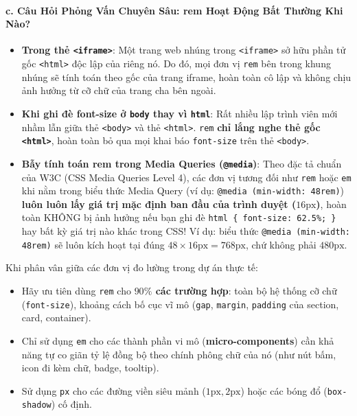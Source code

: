 \documentclass[11pt,oneside]{book}
\newcommand{\codeinline}[1]{\textcolor{accentOrange}{\texttt{#1}}}
\newcommand{\term}[1]{\textbf{\textcolor{primaryBlue}{#1}}}
\begin{document}
\paragraph{c. Câu Hỏi Phỏng Vấn Chuyên Sâu: rem Hoạt Động Bất Thường Khi Nào?}
\begin{itemize}[leftmargin=1.5em, itemsep=2pt, parsep=0pt]
    \item \textbf{Trong thẻ \codeinline{<iframe>}}: Một trang web nhúng trong \codeinline{<iframe>} sở hữu phần tử gốc \codeinline{<html>} độc lập của riêng nó. Do đó, mọi đơn vị \codeinline{rem} bên trong khung nhúng sẽ tính toán theo gốc của trang iframe, hoàn toàn cô lập và không chịu ảnh hưởng từ cỡ chữ của trang cha bên ngoài.
    \item \textbf{Khi ghi đè font-size ở \codeinline{body} thay vì \codeinline{html}}: Rất nhiều lập trình viên mới nhầm lẫn giữa thẻ \codeinline{<body>} và thẻ \codeinline{<html>}. \codeinline{rem} \textbf{chỉ lắng nghe thẻ gốc \codeinline{<html>}}, hoàn toàn bỏ qua mọi khai báo \codeinline{font-size} trên thẻ \codeinline{<body>}.
    \item \textbf{Bẫy tính toán rem trong Media Queries (\codeinline{@media})}: Theo đặc tả chuẩn của W3C (CSS Media Queries Level 4), các đơn vị tương đối như \codeinline{rem} hoặc \codeinline{em} khi nằm trong biểu thức Media Query (ví dụ: \codeinline{@media (min-width: 48rem)}) \textbf{luôn luôn lấy giá trị mặc định ban đầu của trình duyệt ($16\text{px}$)}, hoàn toàn KHÔNG bị ảnh hưởng nếu bạn ghi đè \codeinline{html \{ font-size: 62.5\%; \}} hay bất kỳ giá trị nào khác trong CSS! Ví dụ: biểu thức \codeinline{@media (min-width: 48rem)} sẽ luôn kích hoạt tại đúng $48 \times 16\text{px} = 768\text{px}$, chứ không phải $480\text{px}$.
\end{itemize}

\begin{tipBox}
Khi phân vân giữa các đơn vị đo lường trong dự án thực tế:
\begin{itemize}[leftmargin=1.2em, itemsep=2pt]
    \item Hãy ưu tiên dùng \codeinline{rem} cho \textbf{$90\%$ các trường hợp}: toàn bộ hệ thống cỡ chữ (\codeinline{font-size}), khoảng cách bố cục vĩ mô (\codeinline{gap}, \codeinline{margin}, \codeinline{padding} của section, card, container).
    \item Chỉ sử dụng \codeinline{em} cho các thành phần vi mô (\term{micro-components}) cần khả năng tự co giãn tỷ lệ đồng bộ theo chính phông chữ của nó (như nút bấm, icon đi kèm chữ, badge, tooltip).
    \item Sử dụng \codeinline{px} cho các đường viền siêu mảnh ($1\text{px}, 2\text{px}$) hoặc các bóng đổ (\codeinline{box-shadow}) cố định.
\end{itemize}
\end{tipBox}
\end{document}

